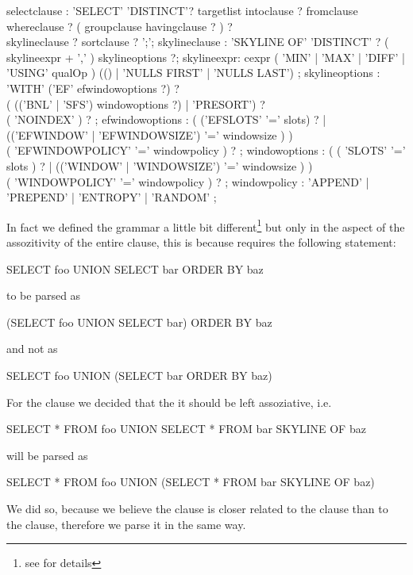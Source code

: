 \begin{rail}

selectclause : 'SELECT' 'DISTINCT'? targetlist intoclause ? fromclause \\ whereclause ? ( groupclause havingclause ? ) ? \\ skylineclause ? sortclause ? ';';
skylineclause : 'SKYLINE OF' 'DISTINCT' ? ( skylineexpr + ',' ) skylineoptions ?;
skylineexpr: cexpr ( 'MIN' | 'MAX' | 'DIFF' | 'USING' qualOp ) (() | 'NULLS FIRST' | 'NULLS LAST') ;
skylineoptions : 'WITH' ('EF' efwindowoptions ?) ? \\ ( (('BNL' | 'SFS') windowoptions ?) | 'PRESORT') ? \\ ( 'NOINDEX' ) ? ;
efwindowoptions : ( ('EFSLOTS' '=' slots) ? | (('EFWINDOW' | 'EFWINDOWSIZE') '=' windowsize ) ) \\ ( 'EFWINDOWPOLICY' '=' windowpolicy ) ? ;
windowoptions : ( ( 'SLOTS' '=' slots ) ? | (('WINDOW' | 'WINDOWSIZE') '=' windowsize ) ) \\ ( 'WINDOWPOLICY' '=' windowpolicy ) ? ;
windowpolicy : 'APPEND' | 'PREPEND' | 'ENTROPY' | 'RANDOM' ;

\end{rail}


In fact we defined the grammar a little bit different\footnote{see  for details} but only in the aspect of the assozitivity of the entire  clause, this is because  requires the following statement:
\begin{sql}SELECT foo UNION SELECT bar ORDER BY baz\end{sql}
to be parsed as 
\begin{sql}(SELECT foo UNION SELECT bar) ORDER BY baz\end{sql}
and not as
\begin{sql}SELECT foo UNION (SELECT bar ORDER BY baz)\end{sql}

\noindent{}For the  clause we decided that the it should be left
assoziative, i.e. 
\begin{sql}SELECT * FROM foo UNION SELECT * FROM bar SKYLINE OF baz\end{sql}
will be parsed as 
\begin{sql}SELECT * FROM foo UNION (SELECT * FROM bar SKYLINE OF baz)\end{sql}

\noindent{}We did so, because we believe the  clause is closer
related to the  clause than to the 
clause, therefore we parse it in the same way.


